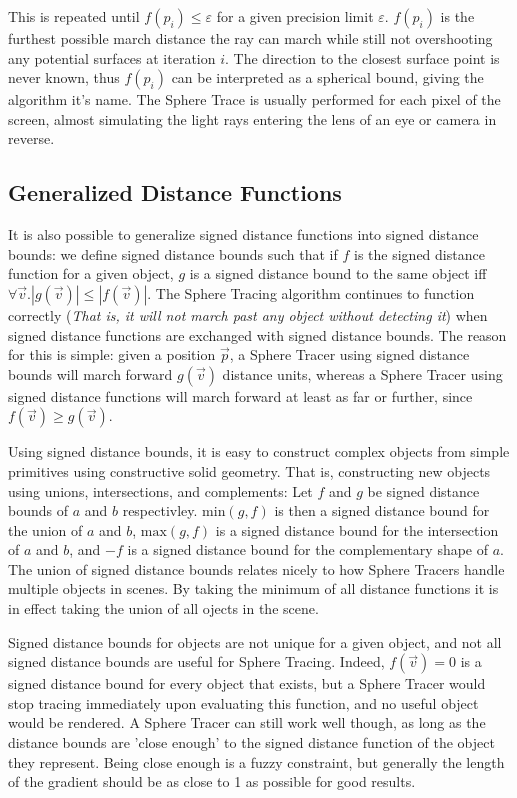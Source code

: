 		This is repeated until $f(p_i) \leq \varepsilon$ for a given precision
		limit $\varepsilon$. $f(p_i)$ is the furthest possible march distance
		the ray can march while still not overshooting any potential surfaces
		at iteration $i$. The direction to the closest surface point is never
		known, thus $f(p_i)$ can be interpreted as a spherical bound, giving
		the algorithm it's name. The Sphere Trace is usually performed for each
		pixel of the screen, almost simulating the light rays entering the
		lens of an eye or camera in reverse.
		
		\subsection{Generalized Distance Functions} \label{CSG}

			It is also possible to generalize signed distance functions into
			signed distance bounds: we define signed distance bounds such that
			if $f$ is the signed distance function for a given object, $g$ is a
			signed distance bound to the same object iff $\forall{} \vec{v}.
			|g(\vec{v})| \leq |f(\vec{v})|$. The Sphere Tracing algorithm
			continues to function correctly (\emph{That is, it will not march
			past any object without detecting it}) when signed distance
			functions are exchanged with signed distance bounds. The reason for
			this is simple: given a position $\vec{p}$, a Sphere Tracer using
			signed distance bounds will march forward $g(\vec{v})$ distance
			units, whereas a Sphere Tracer using signed distance functions will
			march forward at least as far or further, since $f(\vec{v}) \geq
			g(\vec{v})$.

			Using signed distance bounds, it is easy to construct complex
			objects from simple primitives using constructive solid geometry.
			That is, constructing new objects using unions, intersections, and
			complements: Let $f$ and $g$ be signed distance bounds of $a$ and
			$b$ respectivley. $\textrm{min}(g, f)$ is then a signed distance
			bound for the union of $a$ and $b$, $\textrm{max}(g, f)$ is a
			signed distance bound for the intersection of $a$ and $b$, and $-f$
			is a signed distance bound for the complementary shape of
			$a$\cite{Hart1996}. The union of signed distance bounds relates nicely
			to how Sphere Tracers handle multiple objects in scenes. By taking
			the minimum of all distance functions it is in effect taking the
			union of all ojects in the scene.

			Signed distance bounds for objects are not unique for a given
			object, and not all signed distance bounds are useful for Sphere
			Tracing. Indeed, $f(\vec{v}) = 0$ is a signed distance bound for
			every object that exists, but a Sphere Tracer would stop tracing
			immediately upon evaluating this function, and no useful object
			would be rendered. A Sphere Tracer can still work well though, as
			long as the distance bounds are 'close enough' to the signed
			distance function of the object they represent\cite{InigoQuilez}. Being
			close enough is a fuzzy constraint, but generally the length of the
			gradient should be as close to 1 as possible for good
			results\cite{Keinert}.

